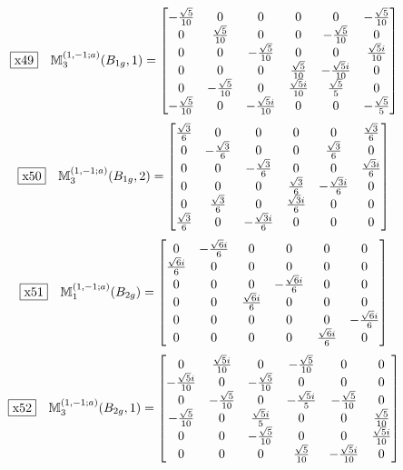 \documentclass[fleqn,10pt,landscape]{jsarticle}
\begin{document}
\begin{dmath*}
\fbox{x49}\quad \mathbb{M}_{3}^{(1,-1;a)}(B_{1g},1)=\begin{bmatrix} - \frac{\sqrt{5}}{10} & 0 & 0 & 0 & 0 & - \frac{\sqrt{5}}{10} \\ 0 & \frac{\sqrt{5}}{10} & 0 & 0 & - \frac{\sqrt{5}}{10} & 0 \\ 0 & 0 & - \frac{\sqrt{5}}{10} & 0 & 0 & \frac{\sqrt{5} i}{10} \\ 0 & 0 & 0 & \frac{\sqrt{5}}{10} & - \frac{\sqrt{5} i}{10} & 0 \\ 0 & - \frac{\sqrt{5}}{10} & 0 & \frac{\sqrt{5} i}{10} & \frac{\sqrt{5}}{5} & 0 \\ - \frac{\sqrt{5}}{10} & 0 & - \frac{\sqrt{5} i}{10} & 0 & 0 & - \frac{\sqrt{5}}{5} \end{bmatrix}
\end{dmath*}
\begin{dmath*}
\fbox{x50}\quad \mathbb{M}_{3}^{(1,-1;a)}(B_{1g},2)=\begin{bmatrix} \frac{\sqrt{3}}{6} & 0 & 0 & 0 & 0 & \frac{\sqrt{3}}{6} \\ 0 & - \frac{\sqrt{3}}{6} & 0 & 0 & \frac{\sqrt{3}}{6} & 0 \\ 0 & 0 & - \frac{\sqrt{3}}{6} & 0 & 0 & \frac{\sqrt{3} i}{6} \\ 0 & 0 & 0 & \frac{\sqrt{3}}{6} & - \frac{\sqrt{3} i}{6} & 0 \\ 0 & \frac{\sqrt{3}}{6} & 0 & \frac{\sqrt{3} i}{6} & 0 & 0 \\ \frac{\sqrt{3}}{6} & 0 & - \frac{\sqrt{3} i}{6} & 0 & 0 & 0 \end{bmatrix}
\end{dmath*}
\begin{dmath*}
\fbox{x51}\quad \mathbb{M}_{1}^{(1,-1;a)}(B_{2g})=\begin{bmatrix} 0 & - \frac{\sqrt{6} i}{6} & 0 & 0 & 0 & 0 \\ \frac{\sqrt{6} i}{6} & 0 & 0 & 0 & 0 & 0 \\ 0 & 0 & 0 & - \frac{\sqrt{6} i}{6} & 0 & 0 \\ 0 & 0 & \frac{\sqrt{6} i}{6} & 0 & 0 & 0 \\ 0 & 0 & 0 & 0 & 0 & - \frac{\sqrt{6} i}{6} \\ 0 & 0 & 0 & 0 & \frac{\sqrt{6} i}{6} & 0 \end{bmatrix}
\end{dmath*}
\begin{dmath*}
\fbox{x52}\quad \mathbb{M}_{3}^{(1,-1;a)}(B_{2g},1)=\begin{bmatrix} 0 & \frac{\sqrt{5} i}{10} & 0 & - \frac{\sqrt{5}}{10} & 0 & 0 \\ - \frac{\sqrt{5} i}{10} & 0 & - \frac{\sqrt{5}}{10} & 0 & 0 & 0 \\ 0 & - \frac{\sqrt{5}}{10} & 0 & - \frac{\sqrt{5} i}{5} & - \frac{\sqrt{5}}{10} & 0 \\ - \frac{\sqrt{5}}{10} & 0 & \frac{\sqrt{5} i}{5} & 0 & 0 & \frac{\sqrt{5}}{10} \\ 0 & 0 & - \frac{\sqrt{5}}{10} & 0 & 0 & \frac{\sqrt{5} i}{10} \\ 0 & 0 & 0 & \frac{\sqrt{5}}{10} & - \frac{\sqrt{5} i}{10} & 0 \end{bmatrix}
\end{dmath*}
\end{document}
